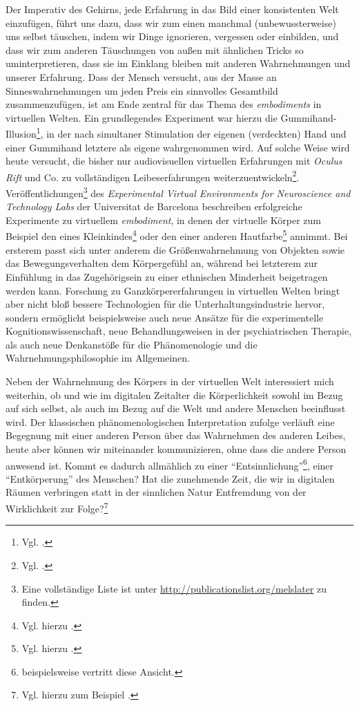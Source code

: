 \documentclass[a4paper]{article}
\begin{document}
Der Imperativ des Gehirns, jede Erfahrung in das Bild einer konsistenten Welt einzufügen, führt uns dazu, dass wir zum einen manchmal (unbewussterweise) uns selbst täuschen, indem wir Dinge ignorieren, vergessen oder einbilden, und dass wir zum anderen Täuschung\-en von außen mit ähnlichen Tricks so uminterpretieren, dass sie im Einklang bleiben mit anderen Wahrnehmungen und unserer Erfahrung. Dass der Mensch versucht, aus der Masse an Sinneswahrnehmungen um jeden Preis ein sinnvolles Gesamtbild zusammenzufügen, ist am Ende zentral für das Thema des \emph{embodiments} in virtuellen Welten. Ein grundlegendes Experiment war hierzu die Gummihand-Illusion\footnote{Vgl. .}, in der nach simultaner Stimulation der eigenen (verdeckten) Hand und einer Gummihand letztere als eigene wahrgenommen wird. Auf solche Weise wird heute versucht, die bisher nur audiovisuellen virtuellen Erfahrungen mit \emph{Oculus Rift} und Co. zu vollständigen Leibeserfahrungen weiterzuentwickeln\footnote{Vgl. .}. Veröffentlichungen\footnote{Eine vollständige Liste ist unter \url{http://publicationslist.org/melslater} zu finden.} des \emph{Experimental Virtual Environments for Neuroscience and Technology Labs} der Universitat de Barcelona beschreiben erfolgreiche Experimente zu virtuellem \emph{embodiment}, in denen der virtuelle Körper zum Beispiel den eines Kleinkindes\footnote{Vgl. hierzu .} oder den einer anderen Hautfarbe\footnote{Vgl. hierzu .} annimmt. Bei ersterem passt sich unter anderem die Größenwahrnehmung von Objekten sowie das Bewegungsverhalten dem Körpergefühl an, während bei letzterem zur Einfühlung in das Zugehörigsein zu einer ethnischen Minderheit beigetragen werden kann. Forschung zu Ganzkörpererfahrungen in virtuellen Welten bringt aber nicht bloß bessere Technologien für die Unterhaltungsindustrie hervor, sondern ermöglicht beispielsweise auch neue Ansätze für die experimentelle Kognitionswissenschaft, neue Behandlungsweisen in der psychiatrischen Therapie, als auch neue Denkanstöße für die Phänomenologie und die Wahrnehmungsphilosophie im Allgemeinen. 

Neben der Wahrnehmung des Körpers in der virtuellen Welt interessiert mich weiterhin, ob und wie im digitalen Zeitalter die Körperlichkeit sowohl im Bezug auf sich selbst, als auch im Bezug auf die Welt und andere Menschen beeinflusst wird. Der klassischen phänomenologischen Interpretation zufolge verläuft eine Begegnung mit einer anderen Person über das Wahrnehmen des anderen Leibes, heute aber können wir miteinander kommunizieren, ohne dass die andere Person anwesend ist. Kommt es dadurch allmählich zu einer "`Entsinnlichung"'\footnote{ beispielsweise vertritt diese Ansicht.}, einer "`Entkörperung"' des Menschen? Hat die zunehmende Zeit, die wir in digitalen Räumen verbringen statt in der sinnlichen Natur Entfremdung von der Wirklichkeit zur Folge?\footnote{Vgl. hierzu zum Beispiel .}   
\end{document}
